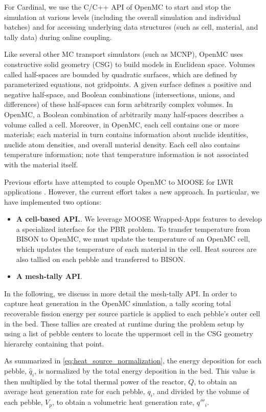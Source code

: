 For Cardinal, we use the C/C++ API of OpenMC to start and stop the simulation at various levels (including the overall
simulation and individual batches) and for accessing underlying data structures (such as cell, material, and
tally data) during online coupling.

Like several other MC transport simulators (such as MCNP), OpenMC uses constructive solid geometry (CSG) to build models in Euclidean space.
Volumes called half-spaces are bounded by quadratic surfaces, which are defined by parameterized equations, not gridpoints. A given surface defines a positive and negative half-space, and Boolean combinations (intersections, unions, and differences) of these half-spaces can form arbitrarily complex volumes. In OpenMC, a Boolean combination of arbitrarily many half-spaces describes a volume called a cell. Moreover, in OpenMC, each cell contains one or more materials; each material in turn contains information about nuclide identities, nuclide atom densities, and overall material density. Each cell also contains temperature information; note that temperature information is not associated with the material itself.

Previous efforts have attempted to couple OpenMC to MOOSE for LWR applications \cite{ellis2017preliminary}.
However, the current effort takes a new approach. In particular, we have implemented two options:
\begin{itemize}
    \item \textbf{A cell-based API.}.  We leverage MOOSE Wrapped-Apps features to develop a specialized interface for the PBR problem. To transfer temperature from BISON to OpenMC, we must update the temperature of an OpenMC cell, which updates the temperature of each material in the cell. Heat sources are also tallied on each pebble and transferred to BISON.
    \item \textbf{A mesh-tally API}.
\end{itemize}

In the following, we discuss in more detail the mesh-tally API. In order to capture heat generation in the OpenMC simulation, a tally scoring total recoverable fission energy per source particle is applied to each pebble's outer cell in the bed. These tallies are created at runtime during the problem setup by using a list of pebble centers to locate the uppermost cell in the CSG geometry hierarchy containing that point.

As summarized in \autoref{eq:heat_source_normalization}, the energy deposition for each pebble, $\hat{q}_{i}$, is normalized by the total energy deposition in the bed.  This value is then multiplied by the total thermal power of the reactor, $Q$, to obtain an average heat generation rate for each pebble, $q_i$, and divided by the volume of each pebble, $V_p$, to obtain a volumetric heat generation rate, $q'''_i$.

